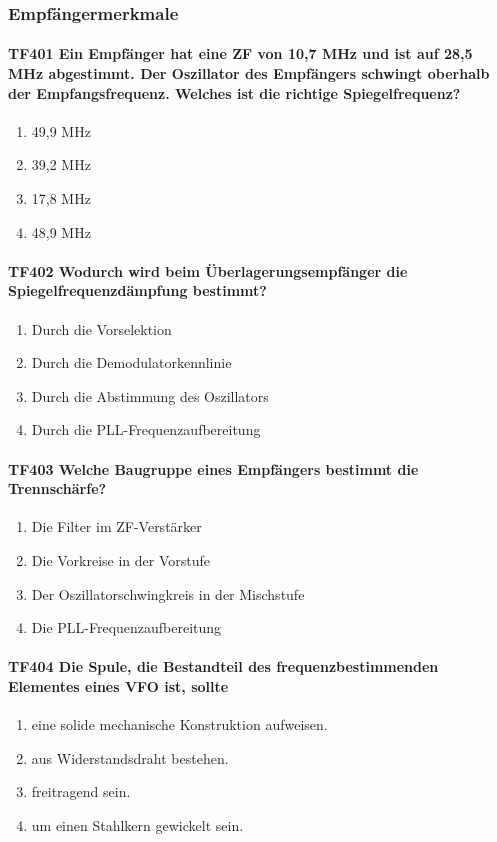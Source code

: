 \documentclass[8pt]{article}
\begin{document}
\pagebreak
\subsubsection{Empfängermerkmale}
\paragraph*{TF401 Ein Empfänger hat eine ZF von 10,7 MHz und ist auf 28,5 MHz abgestimmt. Der Oszillator des Empfängers schwingt oberhalb der Empfangsfrequenz. Welches ist die richtige Spiegelfrequenz?}
\begin{enumerate}[nolistsep,label=\Alph*]
\item 49,9 MHz
\item 39,2 MHz
\item 17,8 MHz
\item 48,9 MHz
\end{enumerate}

\paragraph*{TF402 Wodurch wird beim Überlagerungsempfänger die Spiegelfrequenzdämpfung bestimmt?} 
\begin{enumerate}[nolistsep,label=\Alph*]
\item Durch die Vorselektion
\item Durch die Demodulatorkennlinie
\item Durch die Abstimmung des Oszillators
\item Durch die PLL-Frequenzaufbereitung
\end{enumerate}

\paragraph*{TF403 Welche Baugruppe eines Empfängers bestimmt die Trennschärfe?}
\begin{enumerate}[nolistsep,label=\Alph*]
\item Die Filter im ZF-Verstärker
\item Die Vorkreise in der Vorstufe
\item Der Oszillatorschwingkreis in der Mischstufe
\item Die PLL-Frequenzaufbereitung
\end{enumerate}

\paragraph*{TF404 Die Spule, die Bestandteil des frequenzbestimmenden Elementes eines VFO ist, sollte}
\begin{enumerate}[nolistsep,label=\Alph*]
\item eine solide mechanische Konstruktion aufweisen.
\item aus Widerstandsdraht bestehen.
\item freitragend sein.
\item um einen Stahlkern gewickelt sein.
\end{enumerate}
\end{document}
